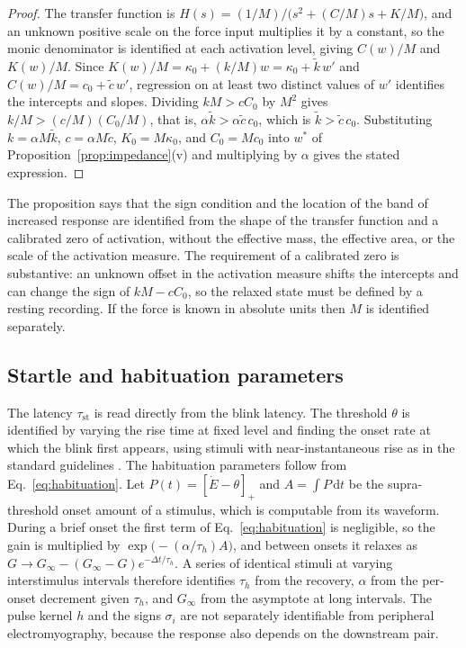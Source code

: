 \documentclass[11pt]{article}
\theoremstyle{plain}
\theoremstyle{definition}
\newcommand{\dd}{\mathrm{d}}
\newcommand{\pos}[1]{\left[#1\right]_{+}}
\begin{document}
\begin{proof}
The transfer function is $H(s)=(1/M)\big/\big(s^2+(C/M)s+K/M\big)$, and an unknown positive scale on the force input multiplies it by a constant, so the monic denominator is identified at each activation level, giving $C(w)/M$ and $K(w)/M$. Since $K(w)/M=\kappa_0+(k/M)w=\kappa_0+\tilde k\,w'$ and $C(w)/M=c_0+\tilde c\,w'$, regression on at least two distinct values of $w'$ identifies the intercepts and slopes. Dividing $kM>cC_0$ by $M^2$ gives $k/M>(c/M)(C_0/M)$, that is, $\alpha\tilde k>\alpha\tilde c\,c_0$, which is $\tilde k>\tilde c\,c_0$. Substituting $k=\alpha M\tilde k$, $c=\alpha M\tilde c$, $K_0=M\kappa_0$, and $C_0=Mc_0$ into $w^{\ast}$ of Proposition~\ref{prop:impedance}(v) and multiplying by $\alpha$ gives the stated expression.
\end{proof}

The proposition says that the sign condition and the location of the band of increased response are identified from the shape of the transfer function and a calibrated zero of activation, without the effective mass, the effective area, or the scale of the activation measure. The requirement of a calibrated zero is substantive: an unknown offset in the activation measure shifts the intercepts and can change the sign of $kM-cC_0$, so the relaxed state must be defined by a resting recording. If the force is known in absolute units then $M$ is identified separately.

\subsection{Startle and habituation parameters}

The latency $\tau_{\mathrm{st}}$ is read directly from the blink latency. The threshold $\theta$ is identified by varying the rise time at fixed level and finding the onset rate at which the blink first appears, using stimuli with near-instantaneous rise as in the standard guidelines \citep{blumenthal2005}. The habituation parameters follow from Eq.~\eqref{eq:habituation}. Let $P(t)=\pos{\dot E-\theta}$ and $A=\int P\,\dd t$ be the supra-threshold onset amount of a stimulus, which is computable from its waveform. During a brief onset the first term of Eq.~\eqref{eq:habituation} is negligible, so the gain is multiplied by $\exp\!\big(-(\alpha/\tau_h)A\big)$, and between onsets it relaxes as $G\to G_\infty-(G_\infty-G)e^{-\Delta t/\tau_h}$. A series of identical stimuli at varying interstimulus intervals therefore identifies $\tau_h$ from the recovery, $\alpha$ from the per-onset decrement given $\tau_h$, and $G_\infty$ from the asymptote at long intervals. The pulse kernel $h$ and the signs $\sigma_i$ are not separately identifiable from peripheral electromyography, because the response also depends on the downstream pair.
\end{document}
